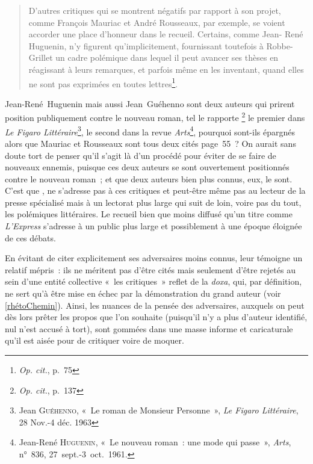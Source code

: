 \documentclass[12pt, a4paper]{article}
\begin{document}
\begin{quote}
    D'autres critiques qui se montrent négatifs par rapport à son projet,
comme François Mauriac et André Rousseaux, par exemple, se voient
accorder une place d’honneur dans le recueil. Certains, comme Jean-
René Huguenin, n’y figurent qu’implicitement, fournissant toutefois à
Robbe-Grillet un cadre polémique dans lequel il peut avancer ses
thèses en réagissant à leurs remarques, et parfois même en les inventant,
quand elles ne sont pas exprimées en toutes lettres\footnote{\textit{Op. cit.}, p.~75}.
\end{quote}

Jean-René~Huguenin mais aussi Jean~Guéhenno sont deux auteurs qui prirent position publiquement contre le nouveau roman, tel le rapporte \galia\footnote{\textit{Op. cit.}, p.~137} le premier dans \textit{Le Figaro Littéraire}\footnote{Jean \textsc{Guéhenno}, «~Le roman de Monsieur Personne~»,\textit{ Le Figaro Littéraire}, 28 Nov.-4 déc. 1963}, le second dans la revue \textit{Arts}\footnote{Jean-René \textsc{Huguenin}, «~Le nouveau roman~: une mode qui passe~», \textit{Arts}, n°~836, 27~sept.-3~oct.~1961.}, pourquoi sont-ils épargnés alors que Mauriac et Rousseaux sont tous deux cités page~55~? 
On aurait sans doute tort de penser qu'il s'agit là d'un procédé pour éviter de se faire de nouveaux ennemis, puisque ces deux auteurs se sont ouvertement positionnés contre le nouveau roman~; et que deux auteurs bien plus connus, eux, le sont. C'est que \punr, ne s'adresse pas à ces critiques et peut-être même pas au lecteur de la presse spécialisé mais à un lectorat plus large qui suit de loin, voire pas du tout, les polémiques littéraires. Le recueil bien que moins diffusé qu'un titre comme \textit{L'Express} s'adresse à un public plus large et possiblement à une époque éloignée de ces débats. 

En évitant de citer explicitement ses adversaires moins connus, \robbe{} leur témoigne un relatif mépris~: ils ne méritent pas d'être cités mais seulement d'être rejetés au sein d'une entité collective «~les critiques~» reflet de la \textit{doxa}, qui, par définition, ne sert qu'à être mise en échec par la démonstration du grand auteur (voir \ref{rhétoChemin}). Ainsi, les nuances de la pensée des adversaires, auxquels on peut dès lors prêter les propos que l'on souhaite (puisqu'il n'y a plus d'auteur identifié, nul n'est accusé à tort), sont gommées dans une masse informe et caricaturale qu'il est aisée pour \robbe{} de critiquer voire de moquer. %
\end{document}
